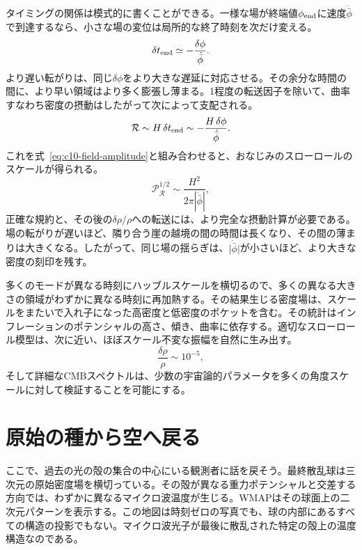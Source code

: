 タイミングの関係は模式的に書くことができる。一様な場が終端値\(\phi_{\rm end}\)に速度\(\dot{\bar\phi}\)で到達するなら、小さな場の変位は局所的な終了時刻を次だけ変える。
\begin{equation}
\delta t_{\rm end}
\simeq-\frac{\delta\phi}{\dot{\bar\phi}}.
\label{eq:c10-time-delay}
\end{equation}
より遅い転がりは、同じ\(\delta\phi\)をより大きな遅延に対応させる。その余分な時間の間に、より早い領域はより多く膨張し薄まる。1程度の転送因子を除いて、曲率すなわち密度の摂動はしたがって次によって支配される。
\begin{equation}
\mathcal R
\sim H\,\delta t_{\rm end}
\sim-\frac{H\,\delta\phi}{\dot{\bar\phi}}.
\label{eq:c10-curvature-estimate}
\end{equation}
これを式~\eqref{eq:c10-field-amplitude}と組み合わせると、おなじみのスローロールのスケールが得られる。
\begin{equation}
\mathcal P_{\mathcal R}^{1/2}
\sim\frac{H^2}{2\pi|\dot{\bar\phi}|},
\label{eq:c10-slow-roll-amplitude}
\end{equation}
正確な規約と、その後の\(\delta\rho/\rho\)への転送には、より完全な摂動計算が必要である。場の転がりが遅いほど、隣り合う崖の越境の間の時間は長くなり、その間の薄まりは大きくなる。したがって、同じ場の揺らぎは、\(\lvert\dot{\bar\phi}\rvert\)が小さいほど、より大きな密度の刻印を残す。

多くのモードが異なる時刻にハッブルスケールを横切るので、多くの異なる大きさの領域がわずかに異なる時刻に再加熱する。その結果生じる密度場は、スケールをまたいで入れ子になった高密度と低密度のポケットを含む。その統計はインフレーションのポテンシャルの高さ、傾き、曲率に依存する。適切なスローロール模型は、次に近い、ほぼスケール不変な振幅を自然に生み出す。
\[
\frac{\delta\rho}{\rho}\sim10^{-5},
\]
そして詳細なCMBスペクトルは、少数の宇宙論的パラメータを多くの角度スケールに対して検証することを可能にする。

\section{原始の種から空へ戻る}

ここで、過去の光の殻の集合の中心にいる観測者に話を戻そう。最終散乱球は三次元の原始密度場を横切っている。その殻が異なる重力ポテンシャルと交差する方向では、わずかに異なるマイクロ波温度が生じる。WMAPはその球面上の二次元パターンを表示する。この地図は時刻ゼロの写真でも、球の内部にあるすべての構造の投影でもない。マイクロ波光子が最後に散乱された特定の殻上の温度構造なのである。

